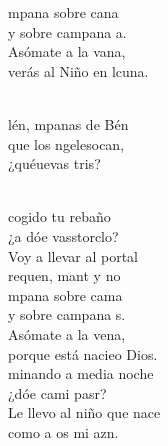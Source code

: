 \documentclass[12pt]{article}
\begin{document}
\begin{multicols*}{2}
\begin{cancion}%
	mpana sobre cana\\
	y sobre campana a.\\
	Asómate a la vana,\\
	verás al Niño en lcuna.\\\jump\\
	\begin{chorus}%
	lén, mpanas de Bén\\
	que los ngelesocan,\\
	¿quéuevas tris?  \\
	\end{chorus}%
	\jump\\
	cogido tu rebaño\\
	¿a dóe vasstorclo? \\
Voy a llevar al portal\\
	requen, mant y no \\
\jump
	mpana sobre cama\\
	y sobre campana s.\\
	Asómate a la vena,\\
	porque está nacieo Dios.\\
\jump
	minando a media noche\\
	¿dóe cami pasr? \\
Le llevo al niño que nace\\
	como a os mi azn.\\
\end{cancion}%


\end{multicols*}
\end{document}
